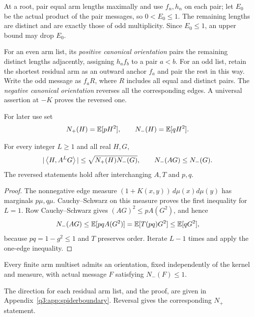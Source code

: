 At a root, pair equal arm lengths maximally and use $f_n,h_n$ on each pair; let $E_0$ be the actual product of the pair messages, so $0<E_0\le1$. The remaining lengths are distinct and are exactly those of odd multiplicity. Since $E_0\le1$, an upper bound may drop $E_0$.

For an even arm list, its \emph{positive canonical orientation} pairs the remaining distinct lengths adjacently, assigning $h_af_b$ to a pair $a<b$. For an odd list, retain the shortest residual arm as an outward anchor $f_a$ and pair the rest in this way. Write the odd message as $f_aR$, where $R$ includes all equal and distinct pairs. The \emph{negative canonical orientation} reverses all the corresponding edges. A universal assertion at $-K$ proves the reversed one.


For later use set
\[
 N_+(H)=\mathbb E[pH^2],\qquad N_-(H)=\mathbb E[qH^2].
\]

\begin{lemma}\label{lem:weighted-interface}\label{lem:connector}
For every integer $L\ge1$ and all real $H,G$,
\[
 |\left\langle H,A^LG\right\rangle|\le\sqrt{N_+(H)N_-(G)},\qquad N_-(AG)\le N_-(G).
\]
The reversed statements hold after interchanging $A,T$ and $p,q$.
\end{lemma}
\begin{proof}
The nonnegative edge measure $(1+K(x,y))\,d\mu(x)d\mu(y)$ has marginals $p\mu,q\mu$. Cauchy--Schwarz on this measure proves the first inequality for $L=1$. Row Cauchy--Schwarz gives $(AG)^2\le pA(G^2)$, and hence
\[
 N_-(AG)\le\mathbb E[pqA(G^2)]=\mathbb E[T(pq)G^2]\le\mathbb E[qG^2],
\]
because $pq=1-g^2\le1$ and $T$ preserves order. Iterate $L-1$ times and apply the one-edge inequality.
\end{proof}

\begin{lemma}\label{lem:spidersecond}
Every finite arm multiset admits an orientation, fixed independently of the kernel and measure, with actual message $F$ satisfying $N_-(F)\le1$.
\end{lemma}
The direction for each residual arm list, and the proof, are given in Appendix~\ref{q3:app:spiderboundary}. Reversal gives the corresponding $N_+$ statement.

